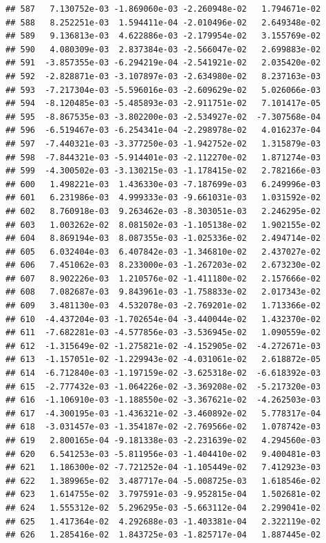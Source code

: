\documentclass[
]{article}
\begin{document}
\begin{verbatim}
## 587   7.130752e-03 -1.869060e-03 -2.260948e-02   1.794671e-02
## 588   8.252251e-03  1.594411e-04 -2.010496e-02   2.649348e-02
## 589   9.136813e-03  4.622886e-03 -2.179954e-02   3.155769e-02
## 590   4.080309e-03  2.837384e-03 -2.566047e-02   2.699883e-02
## 591  -3.857355e-03 -6.294219e-04 -2.541921e-02   2.035420e-02
## 592  -2.828871e-03 -3.107897e-03 -2.634980e-02   8.237163e-03
## 593  -7.217304e-03 -5.596016e-03 -2.609629e-02   5.026066e-03
## 594  -8.120485e-03 -5.485893e-03 -2.911751e-02   7.101417e-05
## 595  -8.867535e-03 -3.802200e-03 -2.534927e-02  -7.307568e-04
## 596  -6.519467e-03 -6.254341e-04 -2.298978e-02   4.016237e-04
## 597  -7.440321e-03 -3.377250e-03 -1.942752e-02   1.315879e-03
## 598  -7.844321e-03 -5.914401e-03 -2.112270e-02   1.871274e-03
## 599  -4.300502e-03 -3.130215e-03 -1.178415e-02   2.782166e-03
## 600   1.498221e-03  1.436330e-03 -7.187699e-03   6.249996e-03
## 601   6.231986e-03  4.999333e-03 -9.661031e-03   1.031592e-02
## 602   8.760918e-03  9.263462e-03 -8.303051e-03   2.246295e-02
## 603   1.003262e-02  8.081502e-03 -1.105138e-02   1.902155e-02
## 604   8.869194e-03  8.087355e-03 -1.025336e-02   2.494714e-02
## 605   6.032404e-03  6.407842e-03 -1.346810e-02   2.437027e-02
## 606   7.451062e-03  8.233000e-03 -1.267203e-02   2.673230e-02
## 607   8.902226e-03  1.210576e-02 -1.411180e-02   2.157666e-02
## 608   7.082687e-03  9.843961e-03 -1.758833e-02   2.017343e-02
## 609   3.481130e-03  4.532078e-03 -2.769201e-02   1.713366e-02
## 610  -4.437204e-03 -1.702654e-04 -3.440044e-02   1.432370e-02
## 611  -7.682281e-03 -4.577856e-03 -3.536945e-02   1.090559e-02
## 612  -1.315649e-02 -1.275821e-02 -4.152905e-02  -4.272671e-03
## 613  -1.157051e-02 -1.229943e-02 -4.031061e-02   2.618872e-05
## 614  -6.712840e-03 -1.197159e-02 -3.625318e-02  -6.618392e-03
## 615  -2.777432e-03 -1.064226e-02 -3.369208e-02  -5.217320e-03
## 616  -1.106910e-03 -1.188550e-02 -3.367621e-02  -4.262503e-03
## 617  -4.300195e-03 -1.436321e-02 -3.460892e-02   5.778317e-04
## 618  -3.031457e-03 -1.354187e-02 -2.769566e-02   1.078742e-03
## 619   2.800165e-04 -9.181338e-03 -2.231639e-02   4.294560e-03
## 620   6.541253e-03 -5.811956e-03 -1.404410e-02   9.400481e-03
## 621   1.186300e-02 -7.721252e-04 -1.105449e-02   7.412923e-03
## 622   1.389965e-02  3.487717e-04 -5.008725e-03   1.618546e-02
## 623   1.614755e-02  3.797591e-03 -9.952815e-04   1.502681e-02
## 624   1.555312e-02  5.296295e-03 -5.663112e-04   2.299041e-02
## 625   1.417364e-02  4.292688e-03 -1.403381e-04   2.322119e-02
## 626   1.285416e-02  1.843725e-03 -1.825717e-04   1.887445e-02

\end{verbatim}
\end{document}
